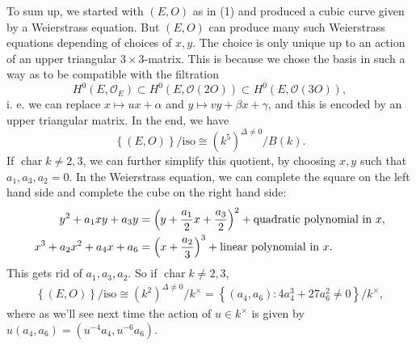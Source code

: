 To sum up, we started with \( (E,O) \) as in (1) and produced a cubic curve given by a Weierstrass equation.
But \( (E,O) \) can produce many such Weierstrass equations depending of choices of \( x,y \).
The choice is only unique up to an action of an upper triangular \( 3\times 3 \)-matrix.
This is because we chose the basis in such a way as to be compatible with the filtration
\[ H^0 \left( E, \mathcal{O}_E \right) \subset H^0 \left( E, \mathcal{O}(2O) \right) \subset H^0 \left( E, \mathcal{O}(3O) \right),  \]
i. e. we can replace \( x \mapsto u x+\alpha \) and \( y \mapsto vy + \beta x + \gamma \), and this is encoded by an upper triangular matrix.
In the end, we have
\[ \left\lbrace (E,O) \right\rbrace/\text{iso} \cong \left( k^5 \right)^{\Delta \neq 0} / B(k) . \]
If \( \operatorname{char}k \neq 2,3 \), we can further simplify this quotient, by choosing \( x,y \) such that \( a_1,a_3,a_2=0 \).
In the Weierstrass equation, we can complete the square on the left hand side and complete the cube on the right hand side:
\begin{align*}
  y^2 + a_1 xy + a_3 y & = \left( y+ \frac{a_1}{2} x + \frac{a_3}{2} \right)^2 + \text{quadratic polynomial in \( x \)} , \\
  x^3 + a_2 x^2 + a_4 x + a_6 &= \left( x + \frac{a_2}{3} \right)^3 + \text{linear polynomial in \( x \)} .
\end{align*}
This gets rid of \( a_1,a_3,a_2 \).
So if \( \operatorname{char} k \neq 2,3 \),
\begin{align*}
  \left\lbrace (E,O) \right\rbrace/\text{iso} \cong \left( k^2 \right)^{\Delta \neq 0} / k^\times = \left\lbrace \left( a_4,a_6 \right) : 4 a_4^3 + 27a_6^2 \neq 0 \right\rbrace / k^\times ,
\end{align*}
where as we'll see next time the action of \( u \in k^\times \) is given by \( u \left( a_4,a_6 \right) = \left( u^{-4} a_4, u^{-6} a_6 \right) \).


